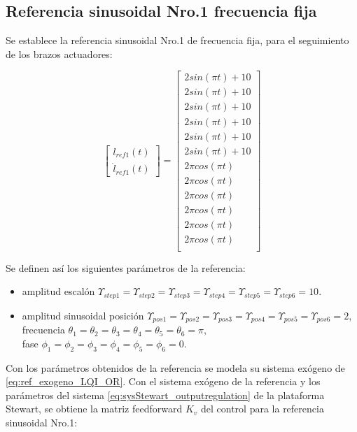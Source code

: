 \subsection{Referencia sinusoidal Nro.1 frecuencia fija}

Se establece la referencia sinusoidal Nro.1 de frecuencia fija, para el seguimiento de los brazos actuadores:

\begin{equation}
    \begin{bmatrix}
        l_{ref1}(t) \\ \dot{l}_{ref1}(t)
    \end{bmatrix} = \begin{bmatrix}
        2 sin(\pi t ) + 10\\
        2 sin(\pi t ) + 10\\
        2 sin(\pi t ) + 10\\
        2 sin(\pi t ) + 10\\
        2 sin(\pi t ) + 10\\
        2 sin(\pi t ) + 10\\
        2 \pi cos(\pi t )\\
        2 \pi cos(\pi t )\\
        2 \pi cos(\pi t )\\
        2 \pi cos(\pi t )\\
        2 \pi cos(\pi t )\\
        2 \pi cos(\pi t )\\
    \end{bmatrix}
\end{equation}

Se definen así los siguientes parámetros de la referencia:
\begin{itemize}
    \item amplitud escalón $\Upsilon_{step1}=\Upsilon_{step2}=\Upsilon_{step3}=\Upsilon_{step4}=\Upsilon_{step5}=\Upsilon_{step6}=10$.
    \item amplitud sinusoidal posición $\Upsilon_{pos1}=\Upsilon_{pos2}=\Upsilon_{pos3}=\Upsilon_{pos4}=\Upsilon_{pos5}=\Upsilon_{pos6}=2$, \\
    frecuencia $\theta_1=\theta_2=\theta_3=\theta_4=\theta_5=\theta_6=\pi$, \\
    fase $\phi_1=\phi_2=\phi_3=\phi_4=\phi_5=\phi_6=0$.
\end{itemize}

Con los parámetros obtenidos de la referencia se modela su sistema exógeno de \ref{eq:ref_exogeno_LQI_OR}. Con el sistema exógeno de la referencia y los parámetros del sistema \ref{eq:sysStewart_outputregulation} de la plataforma Stewart, se obtiene la matriz feedforward $K_v$ del control para la referencia sinusoidal Nro.1:

